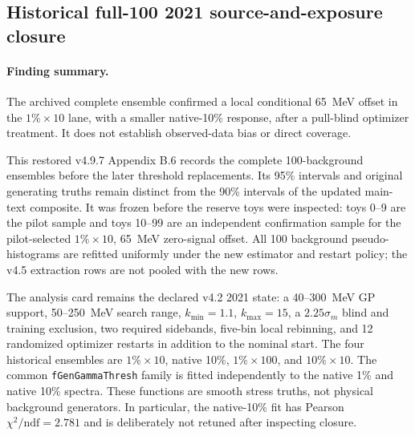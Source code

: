 \subsection{Historical full-100 2021 source-and-exposure closure}
\label{sec:v501-v4p6-exposure-refmatched-full100}

\paragraph{Finding summary.}
The archived complete ensemble confirmed a local conditional 65~MeV offset in the
$1\%\times10$ lane, with a smaller native-10\% response, after a pull-blind
optimizer treatment.  It does not establish observed-data bias or direct coverage.

This restored v4.9.7 Appendix B.6 records the complete 100-background
ensembles before the later threshold replacements. Its 95\% intervals and
original generating truths remain distinct from the 90\% intervals of the
updated main-text composite.  It was frozen before the reserve toys were inspected:
toys 0--9 are the pilot sample and toys 10--99 are an independent confirmation
sample for the pilot-selected $1\%\times10$, 65~MeV zero-signal offset.  All 100
background pseudo-histograms are refitted uniformly under the new estimator and
restart policy; the v4.5 extraction rows are not pooled with the new rows.

The analysis card remains the declared v4.2 2021 state: a 40--300~MeV GP support,
50--250~MeV search range, $k_{\min}=1.1$, $k_{\max}=15$, a
$2.25\sigma_m$ blind and training exclusion, two required sidebands, five-bin local
rebinning, and 12 randomized optimizer restarts in addition to the nominal start.
The four historical ensembles are $1\%\times10$, native 10\%, $1\%\times100$, and
$10\%\times10$.  The common \texttt{fGenGammaThresh} family is fitted independently
to the native 1\% and native 10\% spectra.  These functions are smooth stress truths,
not physical background generators.  In particular, the native-10\% fit has Pearson
$\chi^2/\mathrm{ndf}=2.781$ and is deliberately not retuned after inspecting closure.

